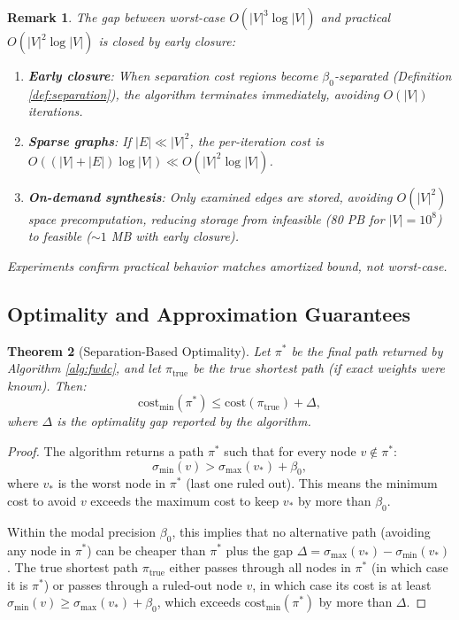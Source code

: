 \documentclass[twocolumn,11pt,a4paper]{article}
\newtheorem{theorem}{Theorem}[section]
\newtheorem{remark}[theorem]{Remark}
\theoremstyle{definition}
\begin{document}
\begin{remark}
The gap between worst-case $O(|V|^3 \log |V|)$ and practical $O(|V|^2 \log |V|)$ is closed by early closure:
\begin{enumerate}
\item \textbf{Early closure}: When separation cost regions become $\beta_0$-separated (Definition \ref{def:separation}), the algorithm terminates immediately, avoiding $O(|V|)$ iterations.
\item \textbf{Sparse graphs}: If $|E| \ll |V|^2$, the per-iteration cost is $O((|V| + |E|) \log |V|) \ll O(|V|^2 \log |V|)$.
\item \textbf{On-demand synthesis}: Only examined edges are stored, avoiding $O(|V|^2)$ space precomputation, reducing storage from infeasible (80 PB for $|V|=10^8$) to feasible ($\sim 1$ MB with early closure).
\end{enumerate}
Experiments confirm practical behavior matches amortized bound, not worst-case.
\end{remark}

\subsection{Optimality and Approximation Guarantees}

\begin{theorem}[Separation-Based Optimality]
\label{thm:optimality}
Let $\pi^*$ be the final path returned by Algorithm \ref{alg:fwdc}, and let $\pi_{\text{true}}$ be the true shortest path (if exact weights were known). Then:
\begin{equation}
\text{cost}_{\min}(\pi^*) \leq \text{cost}(\pi_{\text{true}}) + \Delta,
\end{equation}
where $\Delta$ is the optimality gap reported by the algorithm.
\end{theorem}

\begin{proof}
The algorithm returns a path $\pi^*$ such that for every node $v \notin \pi^*$:
\begin{equation}
\sigma_{\min}(v) > \sigma_{\max}(v_*) + \beta_0,
\end{equation}
where $v_*$ is the worst node in $\pi^*$ (last one ruled out). This means the minimum cost to avoid $v$ exceeds the maximum cost to keep $v_*$ by more than $\beta_0$.

Within the modal precision $\beta_0$, this implies that no alternative path (avoiding any node in $\pi^*$) can be cheaper than $\pi^*$ plus the gap $\Delta = \sigma_{\max}(v_*) - \sigma_{\min}(v_*)$. The true shortest path $\pi_{\text{true}}$ either passes through all nodes in $\pi^*$ (in which case it is $\pi^*$) or passes through a ruled-out node $v$, in which case its cost is at least $\sigma_{\min}(v) \geq \sigma_{\max}(v_*) + \beta_0$, which exceeds $\text{cost}_{\min}(\pi^*)$ by more than $\Delta$.
\end{proof}
\end{document}
